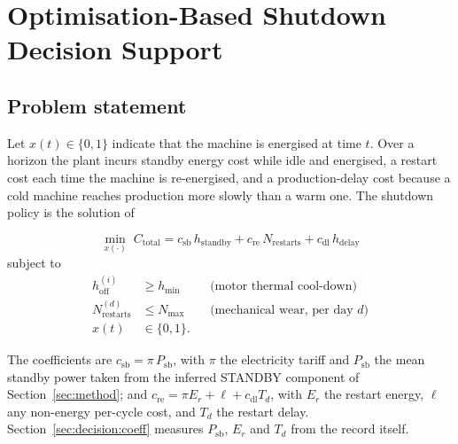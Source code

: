 %
%
%

\section{Optimisation-Based Shutdown Decision Support}
\label{sec:decision}

\subsection{Problem statement}
\label{sec:decision:problem}

Let $x(t)\in\{0,1\}$ indicate that the machine is energised at time $t$.
Over a horizon the plant incurs standby energy cost while idle and
energised, a restart cost each time the machine is re-energised, and a
production-delay cost because a cold machine reaches production more
slowly than a warm one. The shutdown policy is the solution of

\begin{equation}
\label{eq:objective}
\min_{x(\cdot)}\;
C_{\text{total}}
= c_{\text{sb}}\,h_{\text{standby}}
+ c_{\text{re}}\,N_{\text{restarts}}
+ c_{\text{dl}}\,h_{\text{delay}}
\end{equation}
subject to
\begin{align}
h_{\text{off}}^{(i)} &\ge h_{\min}
&&\text{(motor thermal cool-down)} \label{eq:c1}\\
N_{\text{restarts}}^{(d)} &\le N_{\max}
&&\text{(mechanical wear, per day $d$)} \label{eq:c2}\\
x(t) &\in \{0,1\}. \label{eq:c3}
\end{align}

The coefficients are
$c_{\text{sb}} = \pi\,P_{\text{sb}}$, with $\pi$ the electricity tariff
and $P_{\text{sb}}$ the mean standby power taken from the inferred
STANDBY component of Section~\ref{sec:method}; and
$c_{\text{re}} = \pi E_{r} + \ell + c_{\text{dl}} T_{d}$, with $E_{r}$
the restart energy, $\ell$ any non-energy per-cycle cost, and $T_{d}$
the restart delay. Section~\ref{sec:decision:coeff} measures $P_{\text{sb}}$,
$E_r$ and $T_d$ from the record itself.

